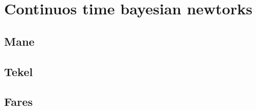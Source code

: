 
\chapter{Continuos time bayesian newtorks}
\label{cap:ctbn}

\lipsum[1]

\section{Mane}
\lipsum[2]

\section{Tekel}
\lipsum[3]

\section{Fares}
\lipsum[4-5]
